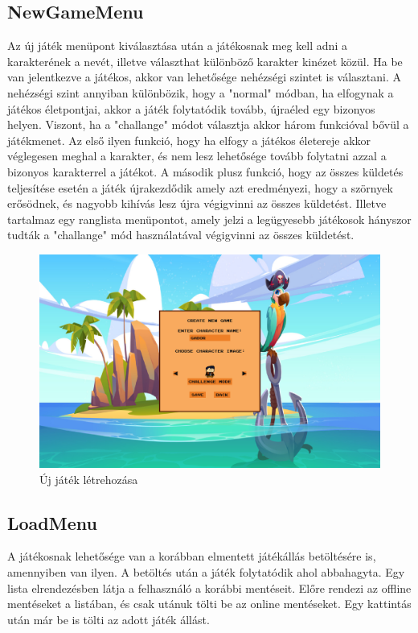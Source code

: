 \subsection{NewGameMenu}
Az új játék menüpont kiválasztása után a játékosnak meg kell adni a karakterének a nevét, illetve választhat különböző karakter kinézet közül. Ha be van jelentkezve a játékos, akkor van lehetősége nehézségi szintet is választani.
A nehézségi szint annyiban különbözik, hogy a "normal" módban, ha elfogynak a játékos életpontjai, akkor a játék folytatódik tovább, újraéled egy bizonyos helyen. Viszont, ha a "challange"  módot választja akkor három funkcióval bővül a játékmenet. Az első ilyen funkció, hogy ha elfogy a játékos életereje akkor véglegesen meghal a karakter, és nem lesz lehetősége tovább folytatni azzal a bizonyos karakterrel a játékot. A második plusz funkció, hogy az összes küldetés teljesítése esetén a játék újrakezdődik amely azt eredményezi, hogy a szörnyek erősödnek, és nagyobb kihívás lesz újra végigvinni az összes küldetést. Illetve tartalmaz egy ranglista menüpontot, amely jelzi a legügyesebb játékosok hányszor tudták a "challange" mód használatával végigvinni az összes küldetést. 

\begin{figure}[H]
    \centering
    \includegraphics[width=15.0truecm]{images/newgame.png}
    \caption{Új játék létrehozása}
    \label{fig:Új játék létrehozása}
\end{figure}


\subsection{LoadMenu}
A játékosnak lehetősége van a korábban elmentett játékállás betöltésére is, amennyiben van ilyen. A betöltés után a játék folytatódik ahol abbahagyta. Egy lista elrendezésben látja a felhasználó a korábbi mentéseit. Előre rendezi az offline mentéseket a listában, és csak utánuk tölti be az online mentéseket. Egy kattintás után már be is tölti az adott játék állást.


